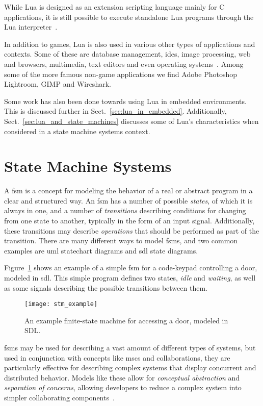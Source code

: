 \noindent
While Lua is designed as an extension scripting language mainly for C applications, it is still possible to execute standalone Lua programs through the Lua interpreter~\cite[ch. 7]{manual:lua_reference_manual}.

\noindent
In addition to games, Lua is also used in various other types of applications and contexts. Some of these are database management, \glspl{ide}, image processing, web and browsers, multimedia, text editors and even operating systems~\cite{website:where_lua_is_used}. Among some of the more famous non-game applications we find Adobe Photoshop Lightroom, GIMP and Wireshark.

\noindent
Some work has also been done towards using Lua in embedded environments. This is discussed further in Sect.~\ref{sec:lua_in_embedded}. Additionally, Sect.~\ref{sec:lua_and_state_machines} discusses some of Lua's characteristics when considered in a state machine systems context.

\section{State Machine Systems}
\label{sec:state_machine_system}
A \gls{fsm} is a concept for modeling the behavior of a real or abstract program in a clear and structured way. An \gls{fsm} has a number of possible \emph{states}, of which it is always in one, and a number of \emph{transitions} describing conditions for changing from one state to another, typically in the form of an input signal. Additionally, these transitions may describe \emph{operations} that should be performed as part of the transition. There are many different ways to model \glspl{fsm}, and two common examples are \gls{uml} statechart diagrams and \gls{sdl} state diagrams.

\noindent
Figure~\ref{fig:fsm_example} shows an example of a simple \gls{fsm} for a code-keypad controlling a door, modeled in \gls{sdl}. This simple program defines two states, \emph{idle} and \emph{waiting}, as well as some signals describing the possible transitions between them.

\begin{figure}[htp]
	\centering
	\texttt{[image: stm\_example]}
	\caption[SDL finite-state machine example]{An example finite-state machine for accessing a door, modeled in SDL.}
	\label{fig:fsm_example}
\end{figure}

\noindent
\glspl{fsm} may be used for describing a vast amount of different types of systems, but used in conjunction with concepts like \glspl{msc} and collaborations, they are particularly effective for describing complex systems that display concurrent and distributed behavior. Models like these allow for \emph{conceptual abstraction} and \emph{separation of concerns}, allowing developers to reduce a complex system into simpler collaborating components~\cite{article:itut_methodologies}.


